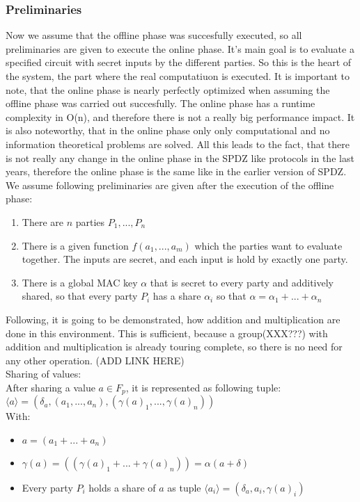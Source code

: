 \documentclass[english,runningheads,a4paper]{llncs}[2018/03/10]
\begin{document}
\subsubsection{Preliminaries}


Now we assume that the offline phase was succesfully executed, so all preliminaries are given to execute the online phase. It's main goal is to evaluate a specified circuit with secret inputs by the different parties. So this is the heart of the system, the part where the real computatiuon is executed. 
It is important to note, that the online phase is nearly perfectly optimized when assuming the offline phase was carried out succesfully. The online phase has a runtime complexity in O(n), and therefore there is not a really big performance impact. It is also noteworthy, that in the online phase only only computational and no information theoretical problems are solved. All this leads to the fact, that there is not really any change in the online phase in the SPDZ like protocols in the last years, therefore the online phase is the same like in the earlier version of SPDZ.\\


We assume following preliminaries are given after the execution of the offline phase:\\
\begin{enumerate}
\item There are \(n\) parties \(P_1,...,P_n\)
\item There is a given function \(f(a_1,...,a_m)\) which the parties want to evaluate together. The inputs are secret, and each input is hold by exactly one party.
\item There is a global MAC key \( \alpha\) that is secret to every party and additively shared, so that every party \( P_i\) has a share  \( \alpha_i\) so that  \( \alpha=\alpha_1+...+\alpha_n\)

\end{enumerate}

Following, it is going to be demonstrated, how addition and multiplication are done in this environment. This is sufficient, because a group(XXX???) with addition and multiplication is already touring complete, so there is no need for any other operation. (ADD LINK HERE)\\


Sharing of values:\\
After sharing a value \( a \in F_p\), it is represented as following tuple:\\
$\langle a\rangle=(\delta_a, (a_1,...,a_n),(\gamma (a)_1,...,\gamma (a)_n))$
\\With:
\begin{itemize}
\item $ a=(a_1+...+a_n)$
\item $ \gamma (a)=((\gamma (a)_1+...+\gamma (a)_n))=\alpha(a+\delta)$
\item Every party \( P_i\) holds a share of \( a\) as tuple \(\langle a_i\rangle = (\delta_a,a_i,\gamma(a)_i )\)

\end{itemize}
\end{document}
